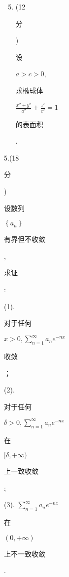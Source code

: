 \documentclass[10pt]{article}
\begin{document}
\begin{enumerate}
  \setcounter{enumi}{4}
  \item (12 \begin{CJK}{UTF8}{mj}分\end{CJK}) \begin{CJK}{UTF8}{mj}设\end{CJK} $a>c>0$, \begin{CJK}{UTF8}{mj}求椭球体\end{CJK} $\frac{x^{2}+y^{2}}{a^{2}}+\frac{z^{2}}{c^{2}}=1$ \begin{CJK}{UTF8}{mj}的表面积\end{CJK}.
\end{enumerate}
5.(18 \begin{CJK}{UTF8}{mj}分\end{CJK}) \begin{CJK}{UTF8}{mj}设数列\end{CJK} $\left\{a_{n}\right\}$ \begin{CJK}{UTF8}{mj}有界但不收敛\end{CJK}, \begin{CJK}{UTF8}{mj}求证\end{CJK}:

(1). \begin{CJK}{UTF8}{mj}对于任何\end{CJK} $x>0, \sum_{n=1}^{\infty} a_{n} e^{-n x}$ \begin{CJK}{UTF8}{mj}收敛\end{CJK}；

(2). \begin{CJK}{UTF8}{mj}对于任何\end{CJK} $\delta>0, \sum_{n=1}^{\infty} a_{n} e^{-n x}$ \begin{CJK}{UTF8}{mj}在\end{CJK} $[\delta,+\infty)$ \begin{CJK}{UTF8}{mj}上一致收敛\end{CJK};

(3). $\sum_{n=1}^{\infty} a_{n} e^{-n x}$ \begin{CJK}{UTF8}{mj}在\end{CJK} $(0,+\infty)$ \begin{CJK}{UTF8}{mj}上不一致收敛\end{CJK}.
\end{document}
